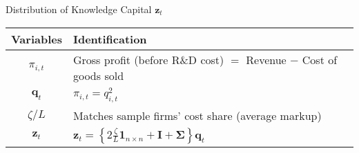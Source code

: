 \documentclass[
  10pt,               %
  aspectratio=169,     %
]{beamer}
\theoremstyle{plain}
\begin{document}
\begin{frame}{Distribution of Knowledge Capital $\bm{z}_t$}
  \begin{table}[htbp]
    \centering
    \begin{tabular}{cl}
      \toprule
      Variables & Identification                                                        \\
      \midrule
      $\pi_{i,t}$
                & Gross profit (before R\&D cost)
      $=$ Revenue $-$ Cost of goods sold                                                \\[6pt]
      $\bm{q}_t$
                &
      $\pi_{i,t}=q_{i,t}^2$                                                             \\[6pt]
      $\zeta/L$
                & Matches sample firms' cost share (average markup)                     \\[6pt]
      $\bm{z}_t$
                &
      $\displaystyle \bm{z}_{t}
      =\left\{2\frac{\zeta}{L}\bm{1}_{n \times n}+\bm{I}+\bm{\Sigma}\right\}\bm{q}_{t}$ \\
      \bottomrule
    \end{tabular}
  \end{table}
\end{frame}
\end{document}
